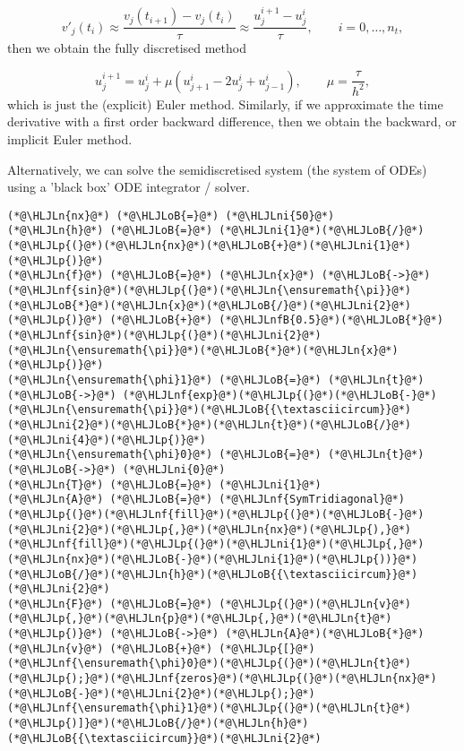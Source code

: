 \documentclass[12pt,landscape]{article}
\newcommand{\HLJLn}[1]{#1}
\newcommand{\HLJLnf}[1]{\textcolor[RGB]{66,102,213}{#1}}
\newcommand{\HLJLnfB}[1]{\textcolor[RGB]{59,151,46}{#1}}
\newcommand{\HLJLni}[1]{\textcolor[RGB]{59,151,46}{#1}}
\newcommand{\HLJLoB}[1]{\textcolor[RGB]{102,102,102}{\textbf{#1}}}
\newcommand{\HLJLp}[1]{#1}
\begin{document}
{\[
v'_j(t_i) \approx \frac{v_j(t_{i+1}) - v_j(t_i)}{\tau} \approx \frac{u^{i+1}_j - u^i_j}{\tau}, \qquad i = 0, \ldots, n_t,
\]
then we obtain the fully discretised method

\[
u^{i+1}_j = u^i_j + \mu\left(u^i_{j+1} - 2u^i_j + u^i_{j-1}   \right), \qquad \mu = \frac{\tau}{h^2},
\]
which is just the (explicit) Euler method.   Similarly, if we approximate the time derivative with a first order backward difference, then we obtain the backward, or implicit Euler method. 

Alternatively, we can solve the semidiscretised system (the system of ODEs) using a 'black box' ODE integrator / solver.


\begin{lstlisting}
(*@\HLJLn{nx}@*) (*@\HLJLoB{=}@*) (*@\HLJLni{50}@*)
(*@\HLJLn{h}@*) (*@\HLJLoB{=}@*) (*@\HLJLni{1}@*)(*@\HLJLoB{/}@*)(*@\HLJLp{(}@*)(*@\HLJLn{nx}@*)(*@\HLJLoB{+}@*)(*@\HLJLni{1}@*)(*@\HLJLp{)}@*)
(*@\HLJLn{f}@*) (*@\HLJLoB{=}@*) (*@\HLJLn{x}@*) (*@\HLJLoB{->}@*) (*@\HLJLnf{sin}@*)(*@\HLJLp{(}@*)(*@\HLJLn{\ensuremath{\pi}}@*)(*@\HLJLoB{*}@*)(*@\HLJLn{x}@*)(*@\HLJLoB{/}@*)(*@\HLJLni{2}@*)(*@\HLJLp{)}@*) (*@\HLJLoB{+}@*) (*@\HLJLnfB{0.5}@*)(*@\HLJLoB{*}@*)(*@\HLJLnf{sin}@*)(*@\HLJLp{(}@*)(*@\HLJLni{2}@*)(*@\HLJLn{\ensuremath{\pi}}@*)(*@\HLJLoB{*}@*)(*@\HLJLn{x}@*)(*@\HLJLp{)}@*)
(*@\HLJLn{\ensuremath{\phi}1}@*) (*@\HLJLoB{=}@*) (*@\HLJLn{t}@*) (*@\HLJLoB{->}@*) (*@\HLJLnf{exp}@*)(*@\HLJLp{(}@*)(*@\HLJLoB{-}@*)(*@\HLJLn{\ensuremath{\pi}}@*)(*@\HLJLoB{{\textasciicircum}}@*)(*@\HLJLni{2}@*)(*@\HLJLoB{*}@*)(*@\HLJLn{t}@*)(*@\HLJLoB{/}@*)(*@\HLJLni{4}@*)(*@\HLJLp{)}@*)
(*@\HLJLn{\ensuremath{\phi}0}@*) (*@\HLJLoB{=}@*) (*@\HLJLn{t}@*) (*@\HLJLoB{->}@*) (*@\HLJLni{0}@*)
(*@\HLJLn{T}@*) (*@\HLJLoB{=}@*) (*@\HLJLni{1}@*)
(*@\HLJLn{A}@*) (*@\HLJLoB{=}@*) (*@\HLJLnf{SymTridiagonal}@*)(*@\HLJLp{(}@*)(*@\HLJLnf{fill}@*)(*@\HLJLp{(}@*)(*@\HLJLoB{-}@*)(*@\HLJLni{2}@*)(*@\HLJLp{,}@*)(*@\HLJLn{nx}@*)(*@\HLJLp{),}@*)(*@\HLJLnf{fill}@*)(*@\HLJLp{(}@*)(*@\HLJLni{1}@*)(*@\HLJLp{,}@*)(*@\HLJLn{nx}@*)(*@\HLJLoB{-}@*)(*@\HLJLni{1}@*)(*@\HLJLp{))}@*)(*@\HLJLoB{/}@*)(*@\HLJLn{h}@*)(*@\HLJLoB{{\textasciicircum}}@*)(*@\HLJLni{2}@*)
(*@\HLJLn{F}@*) (*@\HLJLoB{=}@*) (*@\HLJLp{(}@*)(*@\HLJLn{v}@*)(*@\HLJLp{,}@*)(*@\HLJLn{p}@*)(*@\HLJLp{,}@*)(*@\HLJLn{t}@*)(*@\HLJLp{)}@*) (*@\HLJLoB{->}@*) (*@\HLJLn{A}@*)(*@\HLJLoB{*}@*)(*@\HLJLn{v}@*) (*@\HLJLoB{+}@*) (*@\HLJLp{[}@*)(*@\HLJLnf{\ensuremath{\phi}0}@*)(*@\HLJLp{(}@*)(*@\HLJLn{t}@*)(*@\HLJLp{);}@*)(*@\HLJLnf{zeros}@*)(*@\HLJLp{(}@*)(*@\HLJLn{nx}@*)(*@\HLJLoB{-}@*)(*@\HLJLni{2}@*)(*@\HLJLp{);}@*)(*@\HLJLnf{\ensuremath{\phi}1}@*)(*@\HLJLp{(}@*)(*@\HLJLn{t}@*)(*@\HLJLp{)]}@*)(*@\HLJLoB{/}@*)(*@\HLJLn{h}@*)(*@\HLJLoB{{\textasciicircum}}@*)(*@\HLJLni{2}@*)

\end{lstlisting}}
\end{document}
